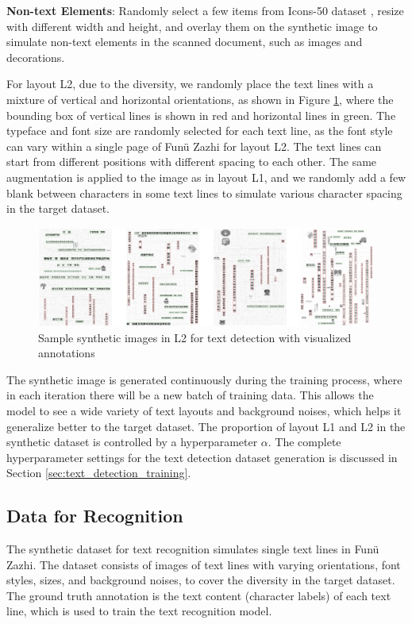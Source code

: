 \documentclass[12pt,twoside]{report}
\begin{document}
\textbf{Non-text Elements}: Randomly select a few items from Icons-50 dataset \cite{icons50}, resize with different width and height, and overlay them on the synthetic image to simulate non-text elements in the scanned document, such as images and decorations.

For layout L2, due to the diversity, we randomly place the text lines with a mixture of vertical and horizontal orientations, as shown in Figure \ref{fig:synthetic_det2}, where the bounding box of vertical lines is shown in red and horizontal lines in green. The typeface and font size are randomly selected for each text line, as the font style can vary within a single page of Funü Zazhi for layout L2. The text lines can start from different positions with different spacing to each other. The same augmentation is applied to the image as in layout L1, and we randomly add a few blank between characters in some text lines to simulate various character spacing in the target dataset.

\begin{figure}[htbp]
    \centering
    \includegraphics[width=\textwidth]{./figures/synthetic_det2.jpeg}
    \caption{Sample synthetic images in L2 for text detection with visualized annotations}
    \label{fig:synthetic_det2}
\end{figure}

The synthetic image is generated continuously during the training process, where in each iteration there will be a new batch of training data. This allows the model to see a wide variety of text layouts and background noises, which helps it generalize better to the target dataset. The proportion of layout L1 and L2 in the synthetic dataset is controlled by a hyperparameter $\alpha$. The complete hyperparameter settings for the text detection dataset generation is discussed in Section \ref{sec:text_detection_training}.

\subsection{Data for Recognition}
\label{sec:synthetic_recognition}
The synthetic dataset for text recognition simulates single text lines in Funü Zazhi. The dataset consists of images of text lines with varying orientations, font styles, sizes, and background noises, to cover the diversity in the target dataset. The ground truth annotation is the text content (character labels) of each text line, which is used to train the text recognition model.
\end{document}

